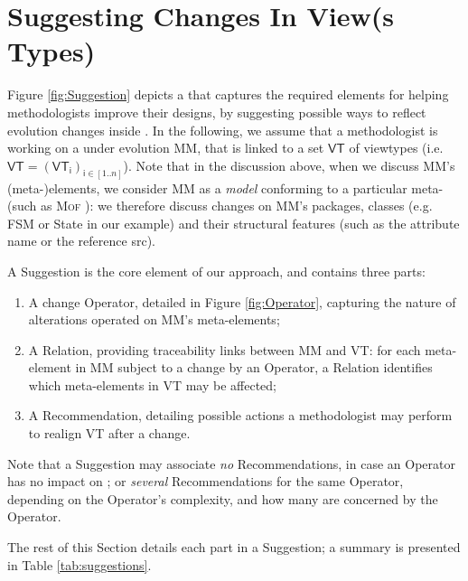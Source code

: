 \section{Suggesting Changes In View(s Types)}
\label{sec:Suggestion}

Figure \ref{fig:Suggestion} depicts a \metamodel that captures the
required elements for helping methodologists improve their \viewtype designs,
by suggesting possible ways to reflect evolution changes inside \viewtypes.
In the following, we assume that a methodologist is working on a \metamodel
under evolution \textsf{MM}, that is linked to a set $\mathsf{VT}$ of viewtypes
(i.e. $\mathsf{VT} = (\mathsf{VT}_\mathsf{i})_{\mathsf{i}\in [1..n]}$). Note that in the discussion above, when we discuss
\textsf{MM}'s (meta-)elements, we consider \textsf{MM} as a \emph{model}
conforming to a particular meta-\metamodel (such as \textsc{Mof} \cite{TR:OMG-MOF:2016}):
we therefore discuss changes on \textsf{MM}'s packages, classes (e.g. 
\textsf{FSM} or \textsf{State} in our example) and their structural features
(such as the attribute \textsf{name} or the reference \textsf{src}).

A \textsf{Suggestion} is the core element of our approach, and contains three 
parts:
\begin{enumerate}
    \item A change \textsf{Operator}, detailed in Figure \ref{fig:Operator}, capturing the nature of
alterations operated on \textsf{MM}'s meta-elements; 
    \item A \textsf{Relation}, providing traceability links between \textsf{MM} 
		and \textsf{VT}: for each meta-element in \textsf{MM} subject to a 
		change by an \textsf{Operator}, a \textsf{Relation} identifies which 
		meta-elements in \textsf{VT} may be affected;
    \item A \textsf{Recommendation}, detailing possible actions a methodologist may perform to realign \textsf{VT} after a change. 
\end{enumerate}

Note that a \textsf{Suggestion} may 
associate \emph{no} \textsf{Recommendation}s, in case an \textsf{Operator} has no
impact on \viewtypes; or \emph{several} \textsf{Recommendation}s for the same 
\textsf{Operator}, depending on the \textsf{Operator}'s complexity, and how 
many \viewtypes are concerned by the \textsf{Operator}.

The rest of this Section details each part in a \textsf{Suggestion}; a summary
is presented in Table \ref{tab:suggestions}.






